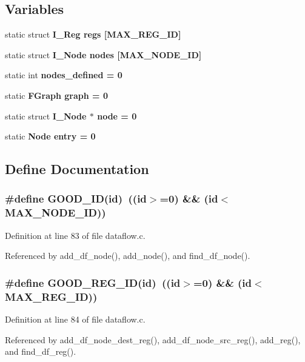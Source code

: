\subsection*{Variables}
\begin{CompactItemize}
\item 
static struct \bf{I\_\-Reg} \bf{regs} [MAX\_\-REG\_\-ID]
\item 
static struct \bf{I\_\-Node} \bf{nodes} [MAX\_\-NODE\_\-ID]
\item 
static int \bf{nodes\_\-defined} = 0
\item 
static \bf{FGraph} \bf{graph} = 0
\item 
static struct \bf{I\_\-Node} $\ast$ \bf{node} = 0
\item 
static \bf{Node} \bf{entry} = 0
\end{CompactItemize}


\subsection{Define Documentation}
\subsubsection{\setlength{\rightskip}{0pt plus 5cm}\#define GOOD\_\-ID(id)~((id$>$=0) \&\& (id$<$MAX\_\-NODE\_\-ID))}\label{dataflow_8c_f4e85281d8e3098e9bda4b454a57c07e}




Definition at line 83 of file dataflow.c.

Referenced by add\_\-df\_\-node(), add\_\-node(), and find\_\-df\_\-node().
\subsubsection{\setlength{\rightskip}{0pt plus 5cm}\#define GOOD\_\-REG\_\-ID(id)~((id$>$=0) \&\& (id$<$MAX\_\-REG\_\-ID))}\label{dataflow_8c_51158b961f002ef88862bdff752f1e9f}




Definition at line 84 of file dataflow.c.

Referenced by add\_\-df\_\-node\_\-dest\_\-reg(), add\_\-df\_\-node\_\-src\_\-reg(), add\_\-reg(), and find\_\-df\_\-reg().
